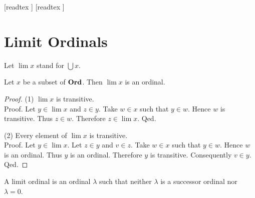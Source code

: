 \documentclass[10pt]{article}
\begin{document}
  \begin{imports}
    \begin{forthel}
      [readtex ]
      [readtex ]
    \end{forthel}
  \end{imports}


  \section*{Limit Ordinals}

  \begin{forthel}
    Let $\lim x$ stand for $\bigcup x$.
  \end{forthel}

  \begin{forthel}
    \begin{proposition}
      Let $x$ be a subset of $\textbf{Ord}$.
      Then $\lim x$ is an ordinal.
    \end{proposition}
    \begin{proof}
      (1) $\lim x$ is transitive. \\
      Proof.
        Let $y \in \lim x$ and $z \in y$.
        Take $w \in x$ such that $y \in w$.
        Hence $w$ is transitive.
        Thus $z \in w$.
        Therefore $z \in \lim x$.
      Qed.

      (2) Every element of $\lim x$ is transitive. \\
      Proof.
        Let $y \in \lim x$.
        Let $z \in y$ and $v \in z$.
        Take $w \in x$ such that $y \in w$.
        Hence $w$ is an ordinal.
        Thus $y$ is an ordinal.
        Therefore $y$ is transitive.
        Consequently $v \in y$.
      Qed.
    \end{proof}
  \end{forthel}

  \begin{forthel}
    \begin{definition}
      A limit ordinal is an ordinal $\lambda$ such that neither $\lambda$ is a successor ordinal nor $\lambda = 0$.
    \end{definition}
  \end{forthel}
\end{document}
